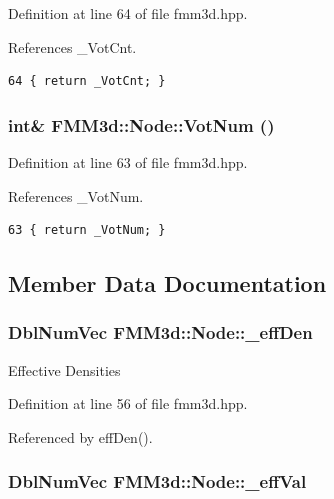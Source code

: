 Definition at line 64 of file fmm3d.hpp.

References \_\-Vot\-Cnt.

\footnotesize\begin{verbatim}64 { return _VotCnt; }
\end{verbatim}\normalsize 


\subsubsection{\setlength{\rightskip}{0pt plus 5cm}int\& FMM3d::Node::Vot\-Num ()\hspace{0.3cm}{\tt  [inline]}}\label{classFMM3d_1_1Node_a83b70cea55e7348666702e85e57f2b5_a83b70cea55e7348666702e85e57f2b5}




Definition at line 63 of file fmm3d.hpp.

References \_\-Vot\-Num.

\footnotesize\begin{verbatim}63 { return _VotNum; }
\end{verbatim}\normalsize 




\subsection{Member Data Documentation}
\subsubsection{\setlength{\rightskip}{0pt plus 5cm}Dbl\-Num\-Vec {\bf FMM3d::Node::\_\-eff\-Den}\hspace{0.3cm}{\tt  [protected]}}\label{classFMM3d_1_1Node_64b4391d323e2e6420f187c1fbd3182f_64b4391d323e2e6420f187c1fbd3182f}


Effective Densities 

Definition at line 56 of file fmm3d.hpp.

Referenced by eff\-Den().
\subsubsection{\setlength{\rightskip}{0pt plus 5cm}Dbl\-Num\-Vec {\bf FMM3d::Node::\_\-eff\-Val}\hspace{0.3cm}{\tt  [protected]}}\label{classFMM3d_1_1Node_97a5333b1cb85d6a8bf1f48ee30ee513_97a5333b1cb85d6a8bf1f48ee30ee513}


